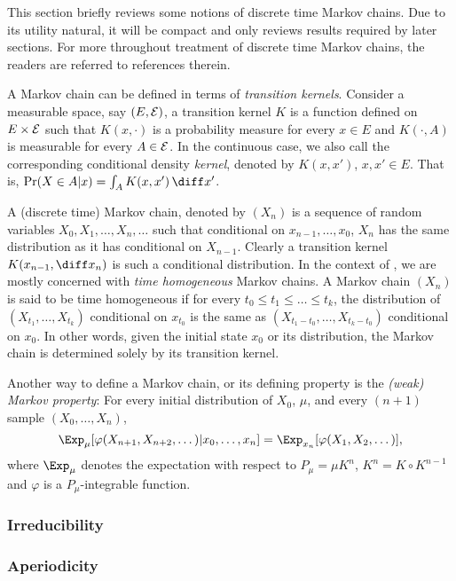 This section briefly reviews some notions of discrete time Markov chains. Due
to its utility natural, it will be compact and only reviews results required
by later sections. For more throughout treatment of discrete time Markov
chains, the readers are referred to references therein.

A Markov chain can be defined in terms of \emph{transition kernels}. Consider
a measurable space, say $(E,\mathcal{E})$, a transition kernel $K$ is a function defined
on $E\times\mathcal{E}$ such that $K(x,\cdot)$ is a probability measure for every
$x\in E$ and $K(\cdot,A)$ is measurable for every $A\in\mathcal{E}$. In the
continuous case, we also call the corresponding conditional density
\emph{kernel}, denoted by $K(x,x')$, $x,x'\in E$. That is, $\Pr(X\in A|x) =
\int_A K(x,x')\intd x'$.

A (discrete time) Markov chain, denoted by $(X_n)$ is a sequence of random
variables $X_0,X_1,\dots,X_n,\dots$ such that conditional on
$x_{n-1},\dots,x_0$, $X_n$ has the same distribution as it has conditional on
$X_{n-1}$. Clearly a transition kernel $K(x_{n-1},\diff x_n)$ is such a
conditional distribution. In the context of \mcmc, we are mostly concerned
with \emph{time homogeneous} Markov chains. A Markov chain $(X_n)$ is said to
be time homogeneous if for every $t_0\le t_1\le\dots\le t_k$, the distribution
of $(X_{t_1},\dots,X_{t_k})$ conditional on $x_{t_0}$ is the same as
$(X_{t_1-t_0},\dots,X_{t_k-t_0})$ conditional on $x_0$. In other words, given
the initial state $x_0$ or its distribution, the Markov chain is determined
solely by its transition kernel.

Another way to define a Markov chain, or its defining property is the
\emph{(weak) Markov property}: For every initial distribution of $X_0$, $\mu$,
and every $(n+1)$ sample $(X_0,\dots,X_n)$,
\begin{equation}
  \Exp_{\mu}[\varphi(X_{n+1},X_{n+2},\dots)|x_0,\dots,x_n] =
  \Exp_{x_n}[\varphi(X_1,X_2,\dots)],
\end{equation}
where $\Exp_{\mu}$ denotes the expectation with respect to $P_{\mu} = \mu
K^n$, $K^n = K\vysmwhtcircle K^{n-1}$ and $\varphi$ is a $P_{\mu}$-integrable
function.

\subsubsection{Irreducibility}
\label{ssub:Irreducibility}

\subsubsection{Aperiodicity}
\label{ssub:Aperiodicity}

